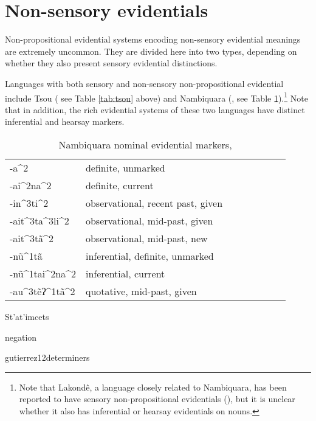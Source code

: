 \documentclass[oneside,a4paper,11pt]{article}
\newcommand{\ipa}[1]{{\phon \mbox{#1}}} %
\begin{document}
\section{Non-sensory evidentials} \label{sec:nonsens}
Non-propositional evidential systems encoding non-sensory evidential meanings are extremely uncommon. They are divided here into two types, depending on whether they also present sensory evidential distinctions.

Languages with  both sensory and non-sensory non-propositional evidential include Tsou (\citealt{yang00tsou.case} see Table \ref{tab:tsou} above) and Nambiquara (\citealt{lowe99nambiquara}, see Table \ref{tab:nambiquara}).\footnote{Note that Lakondê, a language closely related to Nambiquara, has been reported to have sensory non-propositional evidentials (\citealt[248-9]{wetzels06lakonde}), but it is unclear whether it also has inferential or hearsay evidentials on nouns.} Note that in addition, the rich evidential systems of these two languages have distinct inferential and hearsay markers. 


 \begin{table}[H]
 \caption{Nambiquara nominal evidential markers, \citet[282]{lowe99nambiquara} } \centering \label{tab:nambiquara}
\begin{tabular}{llllllll}
\toprule
\ipa{-a^2} & definite, unmarked \\
\ipa{-ai^2na^2} & definite, current \\
\ipa{-in^3ti^2} & observational, recent past, given \\
\ipa{-ait^3ta^3li^2} & observational, mid-past, given \\
\ipa{-ait^3tã^2} & observational, mid-past, new \\
\ipa{-nũ^1tã} & inferential, definite, unmarked \\
\ipa{-nũ^1tai^2na^2} & inferential, current \\
\ipa{-au^3tẽʔ^1tã^2} & quotative, mid-past, given \\
\bottomrule
\end{tabular}
\end{table}


 
 \citet{eberhard09nambikwara}
 
 \citet{murray10evd}
 \citet{murray11hamblin}
 \citet{faller02cuzco}

St'at'imcets

 negation
  
   \citet[193]{eijk97lillooet}
  \ipa{gutierrez12determiners}
  
\end{document}
